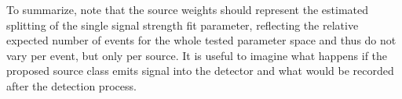 To summarize, note that the source weights should represent the estimated splitting of the single signal strength fit parameter, reflecting the relative expected number of events for the whole tested parameter space and thus do not vary per event, but only per source.
It is useful to imagine what happens if the proposed source class emits signal into the detector and what would be recorded after the detection process.



